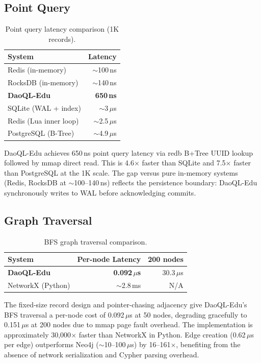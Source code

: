 \documentclass[11pt,a4paper]{article}
\begin{document}
\subsection{Point Query}

\begin{table}[ht]
\centering
\caption{Point query latency comparison (1K records).}
\begin{tabular}{lr}
\toprule
\textbf{System} & \textbf{Latency} \\
\midrule
Redis (in-memory)        & $\sim$100\,ns \\
RocksDB (in-memory)      & $\sim$140\,ns \\
\textbf{DaoQL-Edu}       & \textbf{650\,ns} \\
SQLite (WAL + index)     & $\sim$3\,$\mu$s \\
Redis (Lua inner loop)   & $\sim$2.5\,$\mu$s \\
PostgreSQL (B-Tree)      & $\sim$4.9\,$\mu$s \\
\bottomrule
\end{tabular}
\label{tab:pointquery}
\end{table}

DaoQL-Edu achieves 650\,ns point query latency via redb B+Tree UUID lookup
followed by mmap direct read. This is 4.6$\times$ faster than SQLite and
7.5$\times$ faster than PostgreSQL at the 1K scale. The gap versus pure
in-memory systems (Redis, RocksDB at $\sim$100--140\,ns) reflects the
persistence boundary: DaoQL-Edu synchronously writes to WAL before
acknowledging commits.

\subsection{Graph Traversal}

\begin{table}[ht]
\centering
\caption{BFS graph traversal comparison.}
\begin{tabular}{lrr}
\toprule
\textbf{System} & \textbf{Per-node Latency} & \textbf{200 nodes} \\
\midrule
\textbf{DaoQL-Edu}      & \textbf{0.092\,$\mu$s} & 30.3\,$\mu$s \\
NetworkX (Python)       & $\sim$2.8\,ms          & N/A \\
\bottomrule
\end{tabular}
\label{tab:graph}
\end{table}

The fixed-size record design and pointer-chasing adjacency give DaoQL-Edu's
BFS traversal a per-node cost of 0.092\,$\mu$s at 50 nodes, degrading
gracefully to 0.151\,$\mu$s at 200 nodes due to mmap page fault overhead.
The implementation is approximately 30,000$\times$ faster than NetworkX in
Python. Edge creation (0.62\,$\mu$s per edge) outperforms Neo4j
($\sim$10--100\,$\mu$s) by 16--161$\times$, benefiting from the absence of
network serialization and Cypher parsing overhead.
\end{document}
